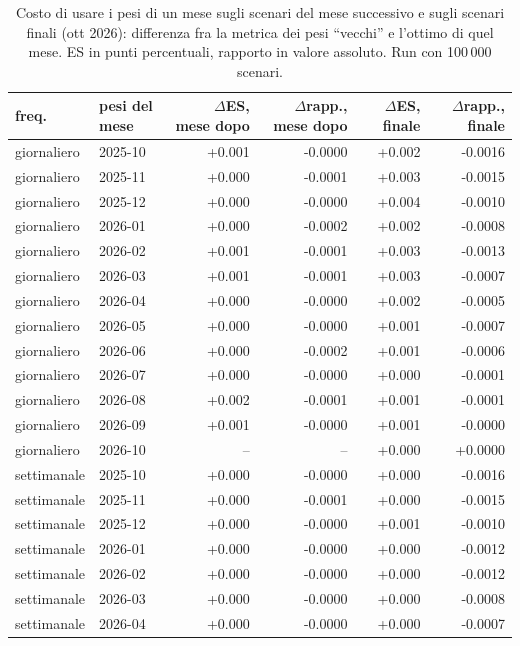 \begin{table}[htbp]\centering\footnotesize\setlength{\tabcolsep}{3.5pt}
\caption{Costo di usare i pesi di un mese sugli scenari del mese successivo e sugli scenari finali (ott 2026): differenza fra la metrica dei pesi ``vecchi'' e l'ottimo di quel mese. ES in punti percentuali, rapporto in valore assoluto. Run con 100\,000 scenari.}\label{tab:cross}
\begin{tabular}{llrrrr}\toprule
freq. & pesi del mese & $\Delta$ES, mese dopo & $\Delta$rapp., mese dopo & $\Delta$ES, finale & $\Delta$rapp., finale \\\midrule
giornaliero & 2025-10 & +0.001 & -0.0000 & +0.002 & -0.0016 \\
giornaliero & 2025-11 & +0.000 & -0.0001 & +0.003 & -0.0015 \\
giornaliero & 2025-12 & +0.000 & -0.0000 & +0.004 & -0.0010 \\
giornaliero & 2026-01 & +0.000 & -0.0002 & +0.002 & -0.0008 \\
giornaliero & 2026-02 & +0.001 & -0.0001 & +0.003 & -0.0013 \\
giornaliero & 2026-03 & +0.001 & -0.0001 & +0.003 & -0.0007 \\
giornaliero & 2026-04 & +0.000 & -0.0000 & +0.002 & -0.0005 \\
giornaliero & 2026-05 & +0.000 & -0.0000 & +0.001 & -0.0007 \\
giornaliero & 2026-06 & +0.000 & -0.0002 & +0.001 & -0.0006 \\
giornaliero & 2026-07 & +0.000 & -0.0000 & +0.000 & -0.0001 \\
giornaliero & 2026-08 & +0.002 & -0.0001 & +0.001 & -0.0001 \\
giornaliero & 2026-09 & +0.001 & -0.0000 & +0.001 & -0.0000 \\
giornaliero & 2026-10 & -- & -- & +0.000 & +0.0000 \\
settimanale & 2025-10 & +0.000 & -0.0000 & +0.000 & -0.0016 \\
settimanale & 2025-11 & +0.000 & -0.0001 & +0.000 & -0.0015 \\
settimanale & 2025-12 & +0.000 & -0.0000 & +0.001 & -0.0010 \\
settimanale & 2026-01 & +0.000 & -0.0000 & +0.000 & -0.0012 \\
settimanale & 2026-02 & +0.000 & -0.0000 & +0.000 & -0.0012 \\
settimanale & 2026-03 & +0.000 & -0.0000 & +0.000 & -0.0008 \\
settimanale & 2026-04 & +0.000 & -0.0000 & +0.000 & -0.0007 \\

\end{tabular}
\end{table}
